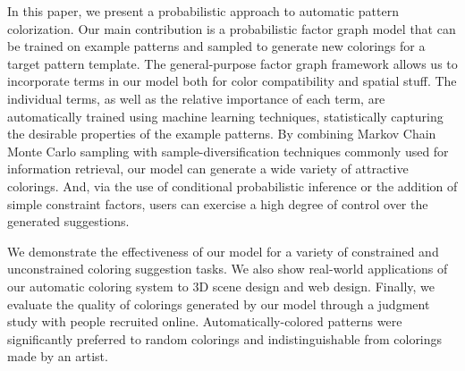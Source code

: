 In this paper, we present a probabilistic approach to automatic pattern colorization. Our main contribution is a probabilistic factor graph model that can be trained on example patterns and sampled to generate new colorings for a target pattern template. The general-purpose factor graph framework allows us to incorporate terms in our model both for color compatibility and spatial stuff. The individual terms, as well as the relative importance of each term, are automatically trained using machine learning techniques, statistically capturing the desirable properties of the example patterns. By combining Markov Chain Monte Carlo sampling with sample-diversification techniques commonly used for information retrieval, our model can generate a wide variety of attractive colorings. And, via the use of conditional probabilistic inference or the addition of simple constraint factors, users can exercise a high degree of control over the generated suggestions.

We demonstrate the effectiveness of our model for a variety of constrained and unconstrained coloring suggestion tasks. We also show real-world applications of our automatic coloring system to 3D scene design and web design. Finally, we evaluate the quality of colorings generated by our model through a judgment study with people recruited online. Automatically-colored patterns were significantly preferred to random colorings and indistinguishable from colorings made by an artist.